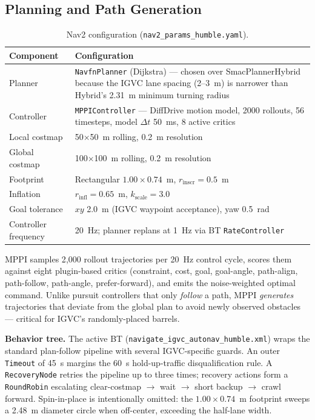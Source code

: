\documentclass[12pt, letterpaper]{article}
\begin{document}
\subsection{Planning and Path Generation}

\begin{table}[H]
    \centering
    \footnotesize
    \caption{Nav2 configuration (\texttt{nav2\_params\_humble.yaml}).}
    \label{tab:nav2}
    \begin{tabularx}{\textwidth}{l X}
        \toprule
        \textbf{Component} & \textbf{Configuration} \\
        \midrule
        Planner & \texttt{NavfnPlanner} (Dijkstra) --- chosen over SmacPlannerHybrid because the IGVC lane spacing (2--3~m) is narrower than Hybrid's 2.31~m minimum turning radius \\
        Controller & \texttt{MPPIController} --- DiffDrive motion model, 2000 rollouts, 56 timesteps, model $\Delta t$ 50~ms, 8 active critics \\
        Local costmap & 50$\times$50~m rolling, 0.2~m resolution \\
        Global costmap & 100$\times$100~m rolling, 0.2~m resolution \\
        Footprint & Rectangular $1.00 \times 0.74$~m, $r_{\text{inscr}} = 0.5$~m \\
        Inflation & $r_{\text{infl}} = 0.65$~m, $k_{\text{scale}} = 3.0$ \\
        Goal tolerance & $xy$ 2.0~m (IGVC waypoint acceptance), yaw 0.5~rad \\
        Controller frequency & 20~Hz; planner replans at 1~Hz via BT \texttt{RateController} \\
        \bottomrule
    \end{tabularx}
\end{table}

MPPI samples 2{,}000 rollout trajectories per 20~Hz control cycle, scores them against
eight plugin-based critics (constraint, cost, goal, goal-angle, path-align, path-follow,
path-angle, prefer-forward), and emits the noise-weighted optimal command. Unlike
pursuit controllers that only \textit{follow} a path, MPPI \textit{generates} trajectories
that deviate from the global plan to avoid newly observed obstacles --- critical for
IGVC's randomly-placed barrels.

\textbf{Behavior tree.} The active BT (\texttt{navigate\_igvc\_autonav\_humble.xml})
wraps the standard plan-follow pipeline with several IGVC-specific guards. An outer
\texttt{Timeout} of 45~s margins the 60~s hold-up-traffic disqualification rule. A
\texttt{RecoveryNode} retries the pipeline up to three times; recovery actions form a
\texttt{RoundRobin} escalating clear-costmap $\to$ wait $\to$ short backup $\to$ crawl
forward. Spin-in-place is intentionally omitted: the $1.00 \times 0.74$~m footprint
sweeps a 2.48~m diameter circle when off-center, exceeding the half-lane width.
\end{document}
